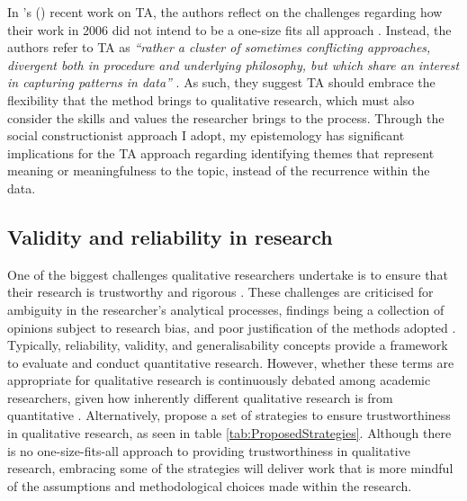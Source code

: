In \citeauthor{braun_one_2020}'s (\citeyear{braun_one_2020}) recent work on TA, the authors reflect on the challenges regarding how their work in 2006 did not intend to be a one-size fits all approach \citep{braun_using_2006}. Instead, the authors refer to TA as \textit{``rather a cluster of sometimes conflicting approaches, divergent both in procedure and underlying philosophy, but which share an interest in capturing patterns in data''} \citep[p.333]{braun_one_2020}. As such, they suggest TA should embrace the flexibility that the method brings to qualitative research, which must also consider the skills and values the researcher brings to the process. Through the social constructionist approach I adopt, my epistemology has significant implications for the TA approach regarding identifying themes that represent meaning or meaningfulness to the topic, instead of the recurrence within the data.

\subsection{Validity and reliability in research}
\label{TA:Reliability}
One of the biggest challenges qualitative researchers undertake is to ensure that their research is trustworthy and rigorous \citep{finlay2006rigour}. These challenges are criticised for ambiguity in the researcher's analytical processes, findings being a collection of opinions subject to research bias, and poor justification of the methods adopted \citep{rolfe2006validity}. Typically, reliability, validity, and generalisability concepts provide a framework to evaluate and conduct quantitative research. However, whether these terms are appropriate for qualitative research is continuously debated among academic researchers, given how inherently different qualitative research is from quantitative \citep{ryan2009rigour}. Alternatively, \cite{noble2015issues} propose a set of strategies to ensure trustworthiness in qualitative research, as seen in table \ref{tab:ProposedStrategies}. Although there is no one-size-fits-all approach to providing trustworthiness in qualitative research, embracing some of the strategies will deliver work that is more mindful of the assumptions and methodological choices made within the research.  

